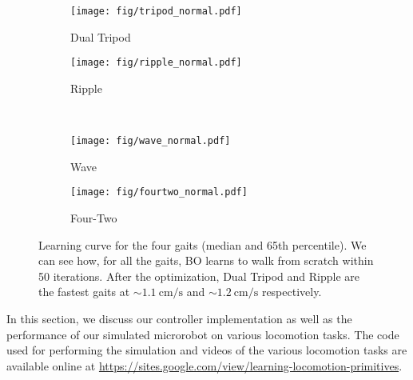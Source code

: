 %
\begin{figure}[t]
  \centering
  \begin{subfigure}{0.49\linewidth}
	  \texttt{[image: fig/tripod\_normal.pdf]}
	  \caption{Dual Tripod}
	  \label{fig:soo:1}
  \end{subfigure}
  \hfill  
  \begin{subfigure}{0.49\linewidth}
	  \texttt{[image: fig/ripple\_normal.pdf]}
	  \caption{Ripple}
	  \label{fig:soo:2}
  \end{subfigure}
  \\
  \begin{subfigure}{0.49\linewidth}
	  \texttt{[image: fig/wave\_normal.pdf]}
	  \caption{Wave}
	  \label{fig:soo:3}
  \end{subfigure}
  \hfill
  \begin{subfigure}{0.49\linewidth}
	  \texttt{[image: fig/fourtwo\_normal.pdf]}
	  \caption{Four-Two}
	  \label{fig:soo:4}
  \end{subfigure}
  \caption{Learning curve for the four gaits (median and 65th percentile). We can see how, for all the gaits, BO learns to walk from scratch within 50 iterations. After the optimization, Dual Tripod and Ripple are the fastest gaits at $\sim \SI[per-mode=symbol]{1.1}{\centi\meter\per\second}$ and $\sim \SI[per-mode=symbol]{1.2}{\centi\meter\per\second}$ respectively.}
  \label{fig:soo}
\end{figure}
%
In this section, we discuss our controller implementation as well as the performance of our simulated microrobot on various locomotion tasks.
The code used for performing the simulation and videos of the various locomotion tasks are available online at \url{https://sites.google.com/view/learning-locomotion-primitives}.


